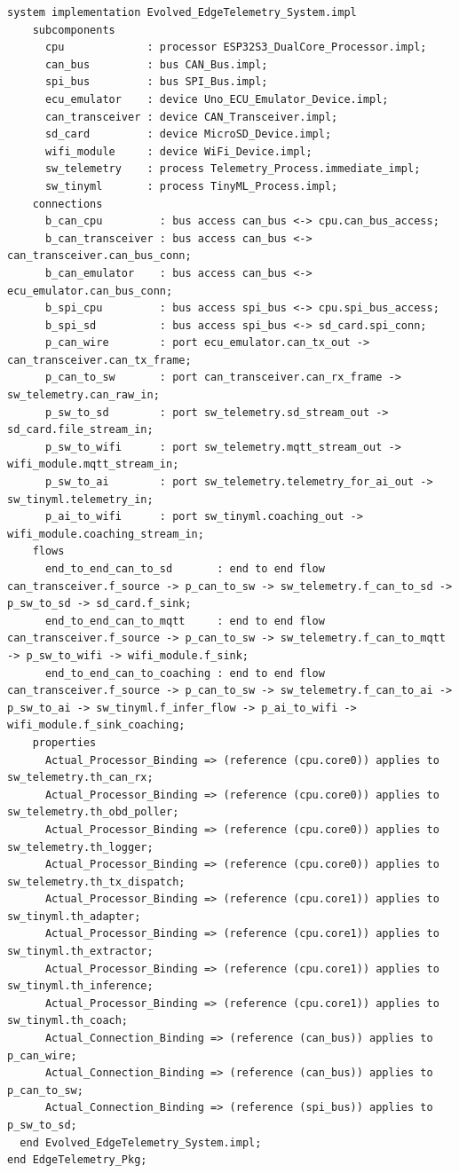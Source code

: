 \begin{lstlisting}[language=AADL, caption={Modelo textual AADL completo consolidado (\texttt{EdgeTelemetryLayer.aadl}).}]
  system implementation Evolved_EdgeTelemetry_System.impl
    subcomponents
      cpu             : processor ESP32S3_DualCore_Processor.impl;
      can_bus         : bus CAN_Bus.impl;
      spi_bus         : bus SPI_Bus.impl;
      ecu_emulator    : device Uno_ECU_Emulator_Device.impl;
      can_transceiver : device CAN_Transceiver.impl;
      sd_card         : device MicroSD_Device.impl;
      wifi_module     : device WiFi_Device.impl;
      sw_telemetry    : process Telemetry_Process.immediate_impl;
      sw_tinyml       : process TinyML_Process.impl;
    connections
      b_can_cpu         : bus access can_bus <-> cpu.can_bus_access;
      b_can_transceiver : bus access can_bus <-> can_transceiver.can_bus_conn;
      b_can_emulator    : bus access can_bus <-> ecu_emulator.can_bus_conn;
      b_spi_cpu         : bus access spi_bus <-> cpu.spi_bus_access;
      b_spi_sd          : bus access spi_bus <-> sd_card.spi_conn;
      p_can_wire        : port ecu_emulator.can_tx_out -> can_transceiver.can_tx_frame;
      p_can_to_sw       : port can_transceiver.can_rx_frame -> sw_telemetry.can_raw_in;
      p_sw_to_sd        : port sw_telemetry.sd_stream_out -> sd_card.file_stream_in;
      p_sw_to_wifi      : port sw_telemetry.mqtt_stream_out -> wifi_module.mqtt_stream_in;
      p_sw_to_ai        : port sw_telemetry.telemetry_for_ai_out -> sw_tinyml.telemetry_in;
      p_ai_to_wifi      : port sw_tinyml.coaching_out -> wifi_module.coaching_stream_in;
    flows
      end_to_end_can_to_sd       : end to end flow can_transceiver.f_source -> p_can_to_sw -> sw_telemetry.f_can_to_sd -> p_sw_to_sd -> sd_card.f_sink;
      end_to_end_can_to_mqtt     : end to end flow can_transceiver.f_source -> p_can_to_sw -> sw_telemetry.f_can_to_mqtt -> p_sw_to_wifi -> wifi_module.f_sink;
      end_to_end_can_to_coaching : end to end flow can_transceiver.f_source -> p_can_to_sw -> sw_telemetry.f_can_to_ai -> p_sw_to_ai -> sw_tinyml.f_infer_flow -> p_ai_to_wifi -> wifi_module.f_sink_coaching;
    properties
      Actual_Processor_Binding => (reference (cpu.core0)) applies to sw_telemetry.th_can_rx;
      Actual_Processor_Binding => (reference (cpu.core0)) applies to sw_telemetry.th_obd_poller;
      Actual_Processor_Binding => (reference (cpu.core0)) applies to sw_telemetry.th_logger;
      Actual_Processor_Binding => (reference (cpu.core0)) applies to sw_telemetry.th_tx_dispatch;
      Actual_Processor_Binding => (reference (cpu.core1)) applies to sw_tinyml.th_adapter;
      Actual_Processor_Binding => (reference (cpu.core1)) applies to sw_tinyml.th_extractor;
      Actual_Processor_Binding => (reference (cpu.core1)) applies to sw_tinyml.th_inference;
      Actual_Processor_Binding => (reference (cpu.core1)) applies to sw_tinyml.th_coach;
      Actual_Connection_Binding => (reference (can_bus)) applies to p_can_wire;
      Actual_Connection_Binding => (reference (can_bus)) applies to p_can_to_sw;
      Actual_Connection_Binding => (reference (spi_bus)) applies to p_sw_to_sd;
  end Evolved_EdgeTelemetry_System.impl;
end EdgeTelemetry_Pkg;
\end{lstlisting}

